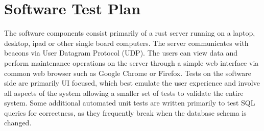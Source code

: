 

\setcounter{section}{4}
\section{Software Test Plan}
\bigskip

The software components consist primarily of a rust server running on a laptop, desktop, ipad or other single board computers.
The server communicates with beacons via User Datagram Protocol (UDP).
The users can view data and perform maintenance operations on the server through a simple web interface via common web browser such as Google Chrome or Firefox.
Tests on the software side are primarily UI focused, which best emulate the user experience and involve all aspects of the system allowing a smaller set of tests to validate the entire system.
Some additional automated unit tests are written primarily to test SQL queries for correctness, as they frequently break when the database schema is changed.

